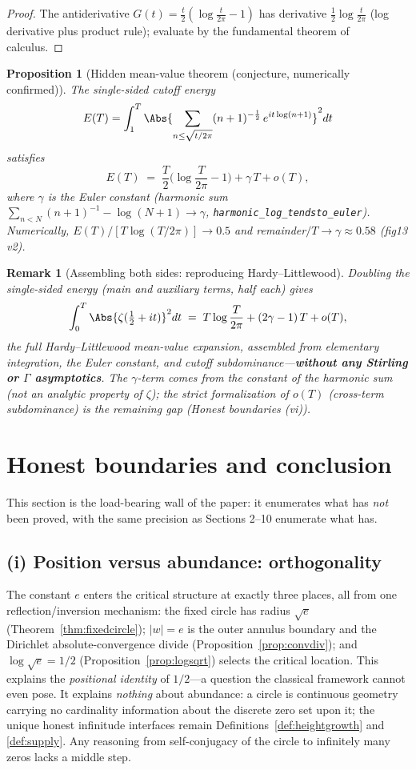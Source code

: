 \documentclass[submission]{jsfds}
\newtheorem{proposition}[theorem]{Proposition}
\newtheorem*{remark}{Remark}
\newcommand{\Lean}[1]{\texttt{#1}}
\newcommand{\abs}[1]{\lvert #1\rvert}
\begin{document}
\begin{proof}
The antiderivative $G(t)=\tfrac{t}{2}(\log\frac{t}{2\pi}-1)$ has derivative
$\tfrac12\log\frac{t}{2\pi}$ (log derivative plus product rule); evaluate by
the fundamental theorem of calculus.
\end{proof}

\begin{proposition}[Hidden mean-value theorem (conjecture, numerically confirmed)]\label{prop:meanvalue}
The single-sided cutoff energy
\[
  E(T)=\int_1^T \Abs{\sum_{n\leq\sqrt{t/2\pi}} (n+1)^{-\frac12}\,e^{it\log(n+1)}}^2 dt
\]
satisfies
\[
  E(T) \;=\; \frac{T}{2}\Big(\log\frac{T}{2\pi}-1\Big) + \gamma\,T + o(T) ,
\]
where $\gamma$ is the Euler constant (harmonic sum
$\sum_{n< N}(n+1)^{-1}-\log(N+1)\to\gamma$,
\Lean{harmonic_log_tendsto_euler}). Numerically,
$E(T)/[T\log(T/2\pi)]\to 0.5$ and remainder$/T\to\gamma\approx 0.58$
(fig13 v2).
\end{proposition}

\begin{remark}[Assembling both sides: reproducing Hardy--Littlewood]\label{remark:hl}
Doubling the single-sided energy (main and auxiliary terms, half each) gives
\[
  \int_0^T \Abs{\zeta(\tfrac12+it)}^2 dt \;=\; T\log\frac{T}{2\pi} + (2\gamma-1)\,T + o(T) ,
\]
the full Hardy--Littlewood mean-value expansion, assembled from elementary
integration, the Euler constant, and cutoff subdominance---\textbf{without
any Stirling or $\Gamma$ asymptotics}. The $\gamma$-term comes from the
constant of the harmonic sum (not an analytic property of $\zeta$); the
strict formalization of $o(T)$ (cross-term subdominance) is the remaining
gap (Honest boundaries (vi)).
\end{remark}

\section{Honest boundaries and conclusion}\label{sec:honesty}

This section is the load-bearing wall of the paper: it enumerates what has
\emph{not} been proved, with the same precision as Sections 2--10 enumerate
what has.

\subsection*{(i) Position versus abundance: orthogonality}
The constant $e$ enters the critical structure at exactly three places, all
from one reflection/inversion mechanism: the fixed circle has radius
$\sqrt{e}$ (Theorem~\ref{thm:fixedcircle}); $\abs{w}=e$ is the outer annulus
boundary and the Dirichlet absolute-convergence divide
(Proposition~\ref{prop:convdiv}); and $\log\sqrt{e}=1/2$
(Proposition~\ref{prop:logsqrt}) selects the critical location. This explains
the \emph{positional identity} of $1/2$---a question the classical framework
cannot even pose. It explains \emph{nothing} about abundance: a circle is
continuous geometry carrying no cardinality information about the discrete
zero set upon it; the unique honest infinitude interfaces remain
Definitions~\ref{def:heightgrowth} and \ref{def:supply}. Any reasoning from
self-conjugacy of the circle to infinitely many zeros lacks a middle step.
\end{document}
